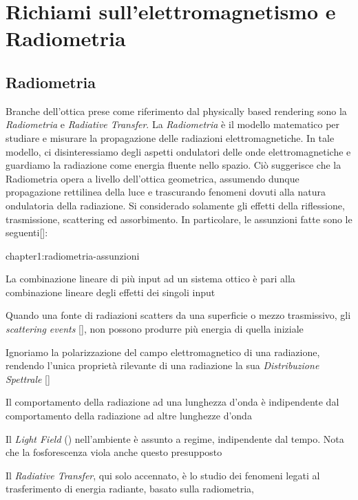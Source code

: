 \label{chapter1}
\chapter{Richiami sull'elettromagnetismo e Radiometria}
\section{Radiometria}
\label{radiometria}
Branche dell'ottica prese come riferimento dal physically based rendering sono la \textit{Radiometria} e \textit{Radiative Transfer}.
La \textit{Radiometria} \`e il modello matematico per studiare e misurare la propagazione delle radiazioni elettromagnetiche. In tale modello, ci 
disinteressiamo degli aspetti ondulatori delle onde elettromagnetiche e guardiamo la radiazione come energia fluente nello spazio. Ci\`o suggerisce
che la Radiometria opera a livello dell'ottica geometrica, assumendo dunque propagazione rettilinea della luce e trascurando fenomeni dovuti alla 
natura ondulatoria della radiazione. Si considerado solamente gli effetti della riflessione, trasmissione, scattering ed assorbimento.
In particolare, le assunzioni fatte sono le seguenti[\cite{pharr}]:
\begin{altDescription}{chapter1:radiometria-assunzioni}
	\item[Linearit\`a] La combinazione lineare di pi\`u input ad un sistema ottico \`e pari alla combinazione lineare degli effetti dei singoli input
	\item[Conservazione dell'energia] Quando una fonte di radiazioni scatters da una superficie o mezzo trasmissivo, gli \textit{scattering events}
		[\cite{pegoraro}], non possono produrre pi\`u energia di quella iniziale
	\item[No polarizzazione] Ignoriamo la polarizzazione del campo elettromagnetico di una radiazione, rendendo l'unica propriet\`a rilevante di
		una radiazione la sua \textit{Distribuzione Spettrale} []
	\item[No fluorescenza o fosforescenza] Il comportamento della radiazione ad una lunghezza d'onda \`e indipendente dal comportamento della 
		radiazione ad altre lunghezze d'onda
	\item[A regime] Il \textit{Light Field} () nell'ambiente \`e assunto a regime, indipendente dal tempo. Nota che la 
		fosforescenza viola anche questo presupposto
\end{altDescription}
Il \textit{Radiative Transfer}, qui solo accennato, \`e lo studio dei fenomeni legati al trasferimento di energia radiante, basato sulla radiometria,
